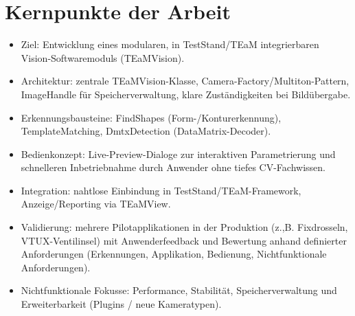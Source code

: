 \documentclass[a4paper,11pt]{article}
\begin{document}
  \section*{Kernpunkte der Arbeit}
  \begin{itemize}

  \item Ziel: Entwicklung eines modularen, in TestStand/TEaM
    integrierbaren Vision-Softwaremoduls (TEaMVision).

  \item Architektur: zentrale TEaMVision-Klasse,
    Camera-Factory/Multiton-Pattern, ImageHandle für
    Speicherverwaltung, klare Zuständigkeiten bei Bildübergabe.

  \item Erkennungsbausteine: FindShapes (Form-/Konturerkennung),
    TemplateMatching, DmtxDetection (DataMatrix-Decoder).

  \item Bedienkonzept: Live-Preview-Dialoge zur interaktiven
    Parametrierung und schnelleren Inbetriebnahme durch Anwender ohne
    tiefes CV-Fachwissen.

  \item Integration: nahtlose Einbindung in TestStand/TEaM-Framework,
    Anzeige/Reporting via TEaMView.

  \item Validierung: mehrere Pilotapplikationen in der Produktion
    (z.,B. Fixdrosseln, VTUX-Ventilinsel) mit Anwenderfeedback und
    Bewertung anhand definierter Anforderungen (Erkennungen,
    Applikation, Bedienung, Nichtfunktionale Anforderungen).

  \item Nichtfunktionale Fokusse: Performance, Stabilität,
    Speicherverwaltung und Erweiterbarkeit (Plugins / neue
    Kameratypen).

  \end{itemize}
\end{document}

